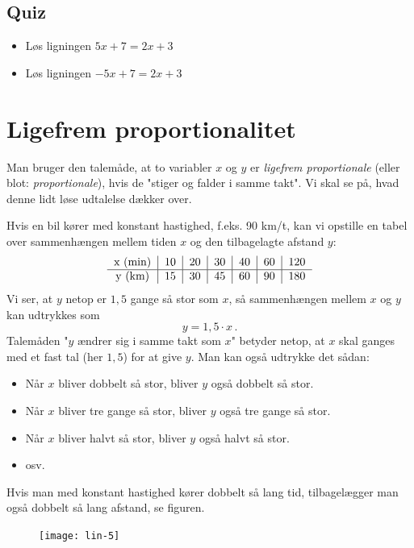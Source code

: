 \documentclass[12pt,oneside,a4paper]{article}
\begin{document}
\subsection{Quiz}
\begin{itemize}
    \item Løs ligningen $5x+7 = 2x+3$
    \item Løs ligningen $-5x+7 = 2x+3$
\end{itemize}



\section{Ligefrem proportionalitet}
Man bruger den talemåde, at to variabler $x$ og $y$ er {\em ligefrem
proportionale} (eller blot: {\em proportionale}), hvis de "stiger og falder i
samme takt". Vi skal se på, hvad denne lidt løse udtalelse dækker over.

Hvis en bil kører med konstant hastighed, f.eks. 90 km/t, kan vi opstille en
tabel over sammenhængen mellem tiden $x$ og den tilbagelagte afstand $y$:
\[
\begin{tabular}{c|c|c|c|c|c|c}
    x ({\rm min}) & 10 & 20 & 30 & 40 & 60 & 120 \\
    \hline
    y ({\rm km})  & 15 & 30 & 45 & 60 & 90 & 180  
\end{tabular}
\]
Vi ser, at $y$ netop er $1,5$ gange så stor som $x$, så sammenhængen mellem $x$
og $y$ kan udtrykkes som
\[
y = 1,5\cdot x \,.
\]
Talemåden "$y$ ændrer sig i samme takt som $x$" betyder netop, at $x$ skal
ganges med et fast tal (her $1,5$) for at give $y$. Man kan også udtrykke det
sådan:
\begin{itemize}
    \item Når $x$ bliver dobbelt så stor, bliver $y$ også dobbelt så stor.
    \item Når $x$ bliver tre gange så stor, bliver $y$ også tre gange så stor.
    \item Når $x$ bliver halvt så stor, bliver $y$ også halvt så stor.
    \item osv.
\end{itemize}
Hvis man med konstant hastighed kører dobbelt så lang tid, tilbagelægger man
også dobbelt så lang afstand, se figuren.

\begin{figure}[H]
    \centering
    \texttt{[image: lin-5]}
\end{figure}
\end{document}
